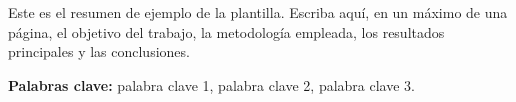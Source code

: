 \begin{resumen}

Este es el resumen de ejemplo de la plantilla. Escriba aquí, en un máximo
de una página, el objetivo del trabajo, la metodología empleada, los
resultados principales y las conclusiones.

\vfill
\textbf{Palabras clave:} palabra clave 1, palabra clave 2, palabra clave 3.
\end{resumen}
